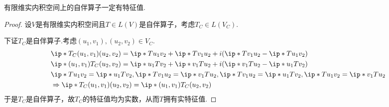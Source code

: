 \begin{theorem}[9.3*]
    有限维实内积空间上的自伴算子一定有特征值.
\end{theorem}

\begin{proof}
    设\(V\)是有限维实内积空间且\(T \in L(V)\)是自伴算子，考虑\(T_C \in L(V_C)\).

    下证\(T_C\)是自伴算子.考虑\((u_1,v_1),(u_2,v_2) \in V_C\).
    \begin{align*}
        &\ip*{T_C(u_1,v_1)}{(u_2,v_2)}=\ip*{Tu_1}{v_2}+\ip*{Tv_1}{u_2}+i(\ip*{Tv_1}{u_2}-\ip*{Tu_1}{v_2}) \\
        &\ip*{(u_1,v_1)}{T_C(u_2,v_2)}=\ip*{u_1}{Tv_2}+\ip*{v_1}{Tu_2}+i(\ip*{v_1}{Tu_2}-\ip*{u_1}{Tv_2}) \\
        &\ip*{Tu_1}{v_2}=\ip*{u_1}{Tv_2},\ip*{Tv_1}{u_2}=\ip*{v_1}{Tu_2},
            \ip*{Tv_1}{u_2}=\ip*{u_1}{Tv_2},\ip*{Tu_1}{v_2}=\ip*{v_1}{Tu_2} \\
        &\Rightarrow \ip*{T_C(u_1,v_1)}{(u_2,v_2)}=\ip*{(u_1,v_1)}{T_C(u_2,v_2)}
    \end{align*}
    于是\(T_C\)是自伴算子，故\(T_C\)的特征值均为实数，从而\(T\)拥有实特征值.
\end{proof}

